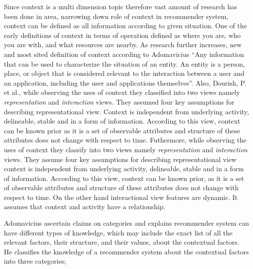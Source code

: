 Since context is a multi dimension topic therefore vast amount of research has been done in area, narrowing down role of context in recommender system, context can be defined as all information according to given situation. One of the early definitions of context in terms of operation \cite{schilit1994disseminating} defined as where you are, who you are with, and what resources are nearby.  As research further increases, new and most sited definition of context according to Adomavicius \cite{adomavicius2011context} “Any information  that  can  be  used  to characterize  the  situation  of  an entity.  An entity is a person, place, or object that is considered relevant to the interaction between a user and an application, including the user and applications  themselves”. Also, Dourish, P. et al., \cite{dourish2004we} while observing the uses of context they classified into two views namely \textit{representation} and \textit{ interaction } views. They assumed four key assumptions for describing representational view. Context is independent from underlying activity, delineable, stable and in a form of information. According to this view, context can be known prior as it is a set of observable attributes and structure of these attributes does not change with respect to  time. Futhermore, \cite{dourish2004we} while observing the uses of context they classify into two views namely \textit{ representation } and \textit{ interaction } views. They assume four key assumptions for describing representational view context is independent from underlying activity, delineable, stable and in a form of information. According to this view, context can be known prior, as it is a set of observable attributes and structure of these attributes does not change with respect to time. On the other hand interactional view features are dynamic. It assumes that context and activity have a relationship.\newline

Adomavicius \cite{adomavicius2011context} ascertain \cite{dourish2004we} claims  on categories  and  explains recommender system can have different types of knowledge, which may include the exact list of all the relevant factors, their structure, and their values, about the contextual factors. He classifies the knowledge of a recommender system about the contextual factors into three categories; \newline

